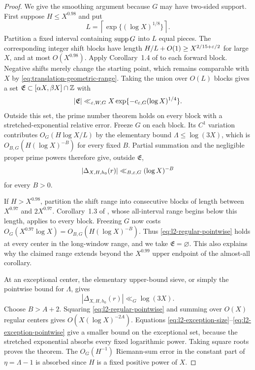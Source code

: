 \begin{proof}
We give the smoothing argument because $G$ may have two-sided support.
First suppose $H\leq X^{0.98}$ and put
\[
 L=\left\lceil\exp\{(\log X)^{1/8}\}\right\rceil.
\]
Partition a fixed interval containing $\operatorname{supp} G$ into $L$ equal pieces.
The corresponding integer shift blocks have length
$H/L+O(1)\geq X^{2/15+\varepsilon/2}$ for large $X$, and at most
$O(X^{0.98})$.  Apply Corollary~1.4 of \citet{GuthMaynard2026} to each
forward block.  Negative shifts merely change the starting point, which
remains comparable with $X$ by
\eqref{eq:translation-geometric-range}.  Taking the union over $O(L)$
blocks gives a set
$\mathfrak E\subset[\alpha X,\beta X]\cap\mathbb Z$ with
\begin{equation}
 |\mathfrak E|\ll_{\varepsilon,W,G}
 X\exp\{-c_{\varepsilon,G}(\log X)^{1/4}\}.
 \label{eq:l2-exception-size}
\end{equation}
Outside this set, the prime number theorem holds on every block with a
stretched-exponential relative error.  Freeze $G$ on each block.  Its
$C^1$ variation contributes $O_G(H\log X/L)$ by the elementary bound
$\Lambda\leq\log(3X)$, which is
$O_{B,G}(H(\log X)^{-B})$ for every fixed $B$.  Partial summation and the
negligible proper prime powers therefore give, outside $\mathfrak E$,
\begin{equation}
 |\Delta_{X,H,h_0}(r)|\ll_{B,\varepsilon,G}(\log X)^{-B}
 \label{eq:l2-regular-pointwise}
\end{equation}
for every $B>0$.

If $H>X^{0.98}$, partition the shift range into consecutive blocks of
length between $X^{0.97}$ and $2X^{0.97}$.  Corollary~1.3 of
\citet{GuthMaynard2026}, whose all-interval range begins below this
length, applies to every block.  Freezing $G$ now costs
$O_G(X^{0.97}\log X)=O_{B,G}(H(\log X)^{-B})$.  Thus
\eqref{eq:l2-regular-pointwise} holds at every center in the long-window
range, and we take $\mathfrak E=\varnothing$.  This also explains why the
claimed range extends beyond the $X^{0.99}$ upper endpoint of the
almost-all corollary.

At an exceptional center, the elementary upper-bound sieve, or simply the
pointwise bound for $\Lambda$, gives
\begin{equation}
 |\Delta_{X,H,h_0}(r)|\ll_G\log(3X).
 \label{eq:l2-exception-pointwise}
\end{equation}
Choose $B>A+2$.  Squaring \eqref{eq:l2-regular-pointwise} and summing over
$O(X)$ regular centers gives $O(X(\log X)^{-2A})$.  Equations
\eqref{eq:l2-exception-size}--\eqref{eq:l2-exception-pointwise} give a
smaller bound on the exceptional set, because the stretched exponential
absorbs every fixed logarithmic power.  Taking square roots proves the
theorem.  The $O_G(H^{-1})$ Riemann-sum error in the constant part of
$\eta=\Lambda-1$ is absorbed since $H$ is a fixed positive power of $X$.
\end{proof}

